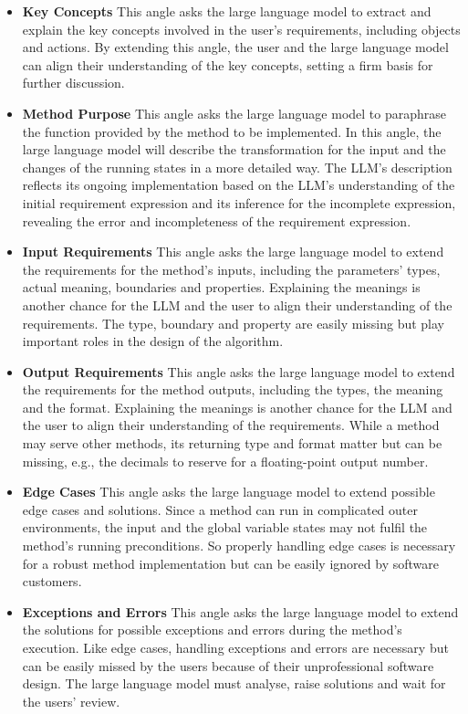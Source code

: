 \documentclass[sigconf]{acmart}
\begin{document}
\begin{itemize}
    \item \textbf{Key Concepts} This angle asks the large language model to extract and explain the key concepts involved in the user's requirements, including objects and actions. By extending this angle, the user and the large language model can align their understanding of the key concepts, setting a firm basis for further discussion.
    \item \textbf{Method Purpose} This angle asks the large language model to paraphrase the function provided by the method to be implemented. In this angle, the large language model will describe the transformation for the input and the changes of the running states in a more detailed way. The LLM's description reflects its ongoing implementation based on the LLM's understanding of the initial requirement expression and its inference for the incomplete expression, revealing the error and incompleteness of the requirement expression.
    \item \textbf{Input Requirements} This angle asks the large language model to extend the requirements for the method's inputs, including the parameters' types, actual meaning, boundaries and properties. Explaining the meanings is another chance for the LLM and the user to align their understanding of the requirements. The type, boundary and property are easily missing but play important roles in the design of the algorithm.
    \item \textbf{Output Requirements} This angle asks the large language model to extend the requirements for the method outputs, including the types, the meaning and the format. Explaining the meanings is another chance for the LLM and the user to align their understanding of the requirements. While a method may serve other methods, its returning type and format matter but can be missing, e.g., the decimals to reserve for a floating-point output number.
    \item \textbf{Edge Cases} This angle asks the large language model to extend possible edge cases and solutions. Since a method can run in complicated outer environments, the input and the global variable states may not fulfil the method's running preconditions. So properly handling edge cases is necessary for a robust method implementation but can be easily ignored by software customers. 
    \item \textbf{Exceptions and Errors} This angle asks the large language model to extend the solutions for possible exceptions and errors during the method's execution. Like edge cases, handling exceptions and errors are necessary but can be easily missed by the users because of their unprofessional software design. The large language model must analyse, raise solutions and wait for the users' review.
\end{itemize}
\end{document}
